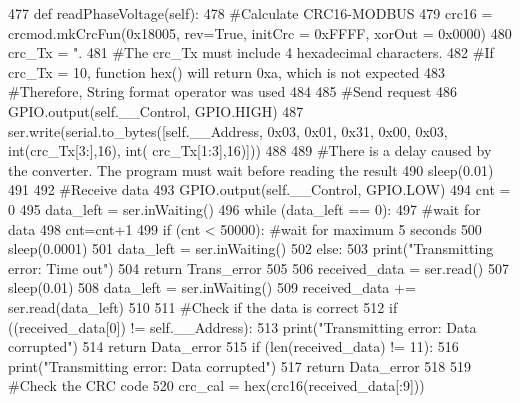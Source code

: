 \begin{DoxyCode}
477     \textcolor{keyword}{def }readPhaseVoltage(self):
478         \textcolor{comment}{#Calculate CRC16-MODBUS
}
479         crc16 = crcmod.mkCrcFun(0x18005, rev=\textcolor{keyword}{True}, initCrc = 0xFFFF, xorOut = 0x0000)
480         crc\_Tx = \textcolor{stringliteral}{".%
481         \textcolor{comment}{#The crc\_Tx must include 4 hexadecimal characters.
}
482         \textcolor{comment}{#If crc\_Tx =  10, function hex() will return 0xa, which is not expected
}
483         \textcolor{comment}{#Therefore, String format operator was used
}
484     
485         \textcolor{comment}{#Send request
}
486         GPIO.output(self.\_\_Control, GPIO.HIGH)
487         ser.write(serial.to\_bytes([self.\_\_Address, 0x03, 0x01, 0x31, 0x00, 0x03, int(crc\_Tx[3:],16), int(
      crc\_Tx[1:3],16)]))
488     
489         \textcolor{comment}{#There is a delay caused by the converter. The program must wait before reading the result
}
490         sleep(0.01)
491     
492         \textcolor{comment}{#Receive data
}
493         GPIO.output(self.\_\_Control, GPIO.LOW)
494         cnt = 0
495         data\_left = ser.inWaiting()
496         \textcolor{keywordflow}{while} (data\_left == 0):
497             \textcolor{comment}{#wait for data
}
498             cnt=cnt+1
499             \textcolor{keywordflow}{if} (cnt < 50000): \textcolor{comment}{#wait for maximum 5 seconds
}
500                 sleep(0.0001)
501                 data\_left = ser.inWaiting()
502             \textcolor{keywordflow}{else}:
503                 print(\textcolor{stringliteral}{"Transmitting error: Time out"})
504                 \textcolor{keywordflow}{return} Trans\_error
505     
506         received\_data = ser.read()
507         sleep(0.01)
508         data\_left = ser.inWaiting()
509         received\_data += ser.read(data\_left)
510         
511         \textcolor{comment}{#Check if the data is correct
}
512         \textcolor{keywordflow}{if} ((received\_data[0]) != self.\_\_Address):
513             print(\textcolor{stringliteral}{"Transmitting error: Data corrupted"})
514             \textcolor{keywordflow}{return} Data\_error
515         \textcolor{keywordflow}{if} (len(received\_data) != 11):
516             print(\textcolor{stringliteral}{"Transmitting error: Data corrupted"})
517             \textcolor{keywordflow}{return} Data\_error
518         
519         \textcolor{comment}{#Check the CRC code
}
520         crc\_cal = hex(crc16(received\_data[:9]))
}
\end{DoxyCode}
